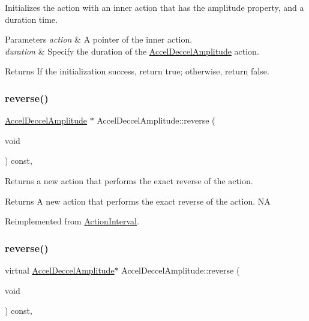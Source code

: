 Initializes the action with an inner action that has the amplitude property, and a duration time. 


\begin{DoxyParams}{Parameters}
{\em action} & A pointer of the inner action. \\
\hline
{\em duration} & Specify the duration of the \hyperlink{classAccelDeccelAmplitude}{Accel\+Deccel\+Amplitude} action. \\
\hline
\end{DoxyParams}
\begin{DoxyReturn}{Returns}
If the initialization success, return true; otherwise, return false. 
\end{DoxyReturn}
\mbox{\label{classAccelDeccelAmplitude_afd103ab39995dc66fe03853e7c937c45}} 
\subsubsection{\texorpdfstring{reverse()}{reverse()}\hspace{0.1cm}{\footnotesize\ttfamily [1/2]}}
{\footnotesize\ttfamily \hyperlink{classAccelDeccelAmplitude}{Accel\+Deccel\+Amplitude} $\ast$ Accel\+Deccel\+Amplitude\+::reverse (\begin{DoxyParamCaption}\item[{void}]{ }\end{DoxyParamCaption}) const\hspace{0.3cm}{\ttfamily [override]}, {\ttfamily [virtual]}}

Returns a new action that performs the exact reverse of the action.

\begin{DoxyReturn}{Returns}
A new action that performs the exact reverse of the action.  NA 
\end{DoxyReturn}


Reimplemented from \hyperlink{classActionInterval_a9f9ac7164036a0bc261a72f62a2b2da7}{Action\+Interval}.

\mbox{\label{classAccelDeccelAmplitude_ab0703eb5fa9cb39014d3a4430b19b05b}} 
\subsubsection{\texorpdfstring{reverse()}{reverse()}\hspace{0.1cm}{\footnotesize\ttfamily [2/2]}}
{\footnotesize\ttfamily virtual \hyperlink{classAccelDeccelAmplitude}{Accel\+Deccel\+Amplitude}$\ast$ Accel\+Deccel\+Amplitude\+::reverse (\begin{DoxyParamCaption}\item[{void}]{ }\end{DoxyParamCaption}) const\hspace{0.3cm}{\ttfamily [override]}, {\ttfamily [virtual]}}

